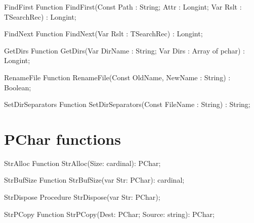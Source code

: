  
\begin{function}{FindFirst}
\Declaration
Function FindFirst(Const Path : String; Attr : Longint; Var Rslt : TSearchRec) : Longint;
\Description
\Errors
\SeeAlso
\end{function}

 
\begin{function}{FindNext}
\Declaration
Function FindNext(Var Rslt : TSearchRec) : Longint;
\Description
\Errors
\SeeAlso
\end{function}

 
\begin{function}{GetDirs}
\Declaration
Function GetDirs(Var DirName : String; Var Dirs : Array of pchar) : Longint; 
\Description
\Errors
\SeeAlso
\end{function}

 
\begin{function}{RenameFile}
\Declaration
Function RenameFile(Const OldName, NewName : String) : Boolean;
\Description
\Errors
\SeeAlso
\end{function}

 
\begin{function}{SetDirSeparators}
\Declaration
Function SetDirSeparators(Const FileName : String) : String;
\Description
\Errors
\SeeAlso
\end{function}

 

\section{PChar functions}

\begin{function}{StrAlloc}
\Declaration
Function StrAlloc(Size: cardinal): PChar;
\Description
\Errors
\SeeAlso
\end{function}

 
\begin{function}{StrBufSize}
\Declaration
Function StrBufSize(var Str: PChar): cardinal;
\Description
\Errors
\SeeAlso
\end{function}

 
\begin{procedure}{StrDispose}
\Declaration
Procedure StrDispose(var Str: PChar);
\Description
\Errors
\SeeAlso
\end{procedure}

 
\begin{function}{StrPCopy}
\Declaration
Function StrPCopy(Dest: PChar; Source: string): PChar;
\Description
\Errors
\SeeAlso
\end{function}

